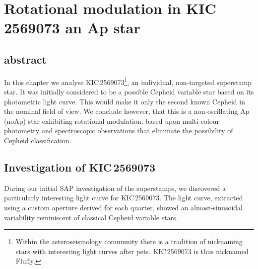 \chapter{Rotational modulation in KIC\,2569073 an Ap star}
\label{chap:fluffy}
\section*{abstract}
    In this chapter we analyse KIC\,2569073\footnote[2]{Within the asteroseismology community there is a tradition of nicknaming stars with interesting light curves after pets. KIC\,2569073 is thus nicknamed Fluffy.}, an individual, non-targeted \Kepler superstamp star. It was initially considered to be a possible Cepheid variable star based on its photometric light curve. This would make it only the second known Cepheid in the nominal \Kepler field of view. We conclude however, that this is a non-oscillating Ap (noAp) star exhibiting rotational modulation, based upon multi-colour photometry and spectroscopic observations that eliminate the possibility of Cepheid classification.
\newpage
\section{Investigation of KIC\,2569073}


During our initial SAP investigation of the \Kepler superstamps, we discovered a particularly interesting light curve for KIC\,2569073. The light curve, extracted using a custom aperture derived for each quarter, showed an almost-sinusoidal variability reminiscent of classical Cepheid variable stars. 

